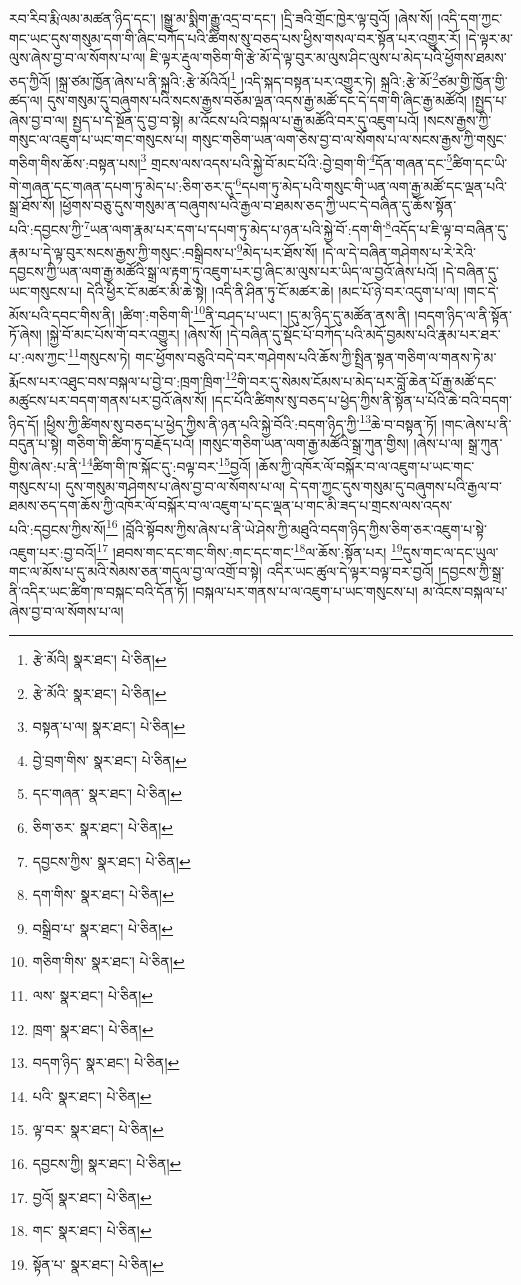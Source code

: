 རབ་རིབ་རྨི་ལམ་མཚན་ཉིད་དང་། །སྒྱུ་མ་སྨིག་རྒྱུ་འདྲ་བ་དང་། །དྲི་ཟའི་གྲོང་ཁྱེར་ལྟ་བུའོ། །ཞེས་སོ། །འདི་དག་ཀྱང་གང་ཡང་དུས་གསུམ་དག་གི་ཞིང་བཀོད་པའི་ཚིགས་སུ་བཅད་པས་ཕྱིས་གསལ་བར་སྟོན་པར་འགྱུར་རོ། །དེ་ལྟར་མ་ལུས་ཞེས་བྱ་བ་ལ་སོགས་པ་ལ། ཇི་ལྟར་རྡུལ་གཅིག་གི་རྩེ་མོ་དེ་ལྟ་བུར་མ་ལུས་ཤིང་ལུས་པ་མེད་པའི་ཕྱོགས་ཐམས་ཅད་ཀྱིའོ། །སྐྲ་ཙམ་ཁྱོན་ཞེས་པ་ནི་སྐྲའི་:རྩེ་མོའིའོ།\footnote{རྩེ་མོའི།  སྣར་ཐང་།  པེ་ཅིན། } །འདི་སྐད་བསྟན་པར་འགྱུར་ཏེ། སྐྲའི་:རྩེ་མོ་\footnote{རྩེ་མོའི་  སྣར་ཐང་།  པེ་ཅིན། }ཙམ་གྱི་ཁྱོན་གྱི་ཚད་ལ། དུས་གསུམ་དུ་བཞུགས་པའི་སངས་རྒྱས་བཅོམ་ལྡན་འདས་རྒྱ་མཚོ་དང་དེ་དག་གི་ཞིང་རྒྱ་མཚོའོ། །སྤྱད་པ་ཞེས་བྱ་བ་ལ། སྤྱད་པ་དེ་སྔོན་དུ་བྱ་བ་སྟེ། མ་འོངས་པའི་བསྐལ་པ་རྒྱ་མཚོའི་བར་དུ་འཇུག་པའོ། །སངས་རྒྱས་ཀྱི་གསུང་ལ་འཇུག་པ་ཡང་གང་གསུངས་པ། གསུང་གཅིག་ཡན་ལག་ཅེས་བྱ་བ་ལ་སོགས་པ་ལ་སངས་རྒྱས་ཀྱི་གསུང་གཅིག་གིས་ཆོས་:བསྟན་པས།\footnote{བསྟན་པ་ལ།  སྣར་ཐང་།  པེ་ཅིན། } གྲངས་ལས་འདས་པའི་སྐྱེ་བོ་མང་པོའི་:བྱེ་བྲག་གི་\footnote{བྱེ་བྲག་གིས་  སྣར་ཐང་།  པེ་ཅིན། }དོན་གཞན་དང་\footnote{དང་གཞན་  སྣར་ཐང་།  པེ་ཅིན། }ཚིག་དང་ཡི་གེ་གཞན་དང་གཞན་དཔག་ཏུ་མེད་པ་:ཅིག་ཅར་དུ་\footnote{ཅིག་ཅར་  སྣར་ཐང་།  པེ་ཅིན། }དཔག་ཏུ་མེད་པའི་གསུང་གི་ཡན་ལག་རྒྱ་མཚོ་དང་ལྡན་པའི་སྒྲ་ཐོས་སོ། །ཕྱོགས་བཅུ་དུས་གསུམ་ན་བཞུགས་པའི་རྒྱལ་བ་ཐམས་ཅད་ཀྱི་ཡང་དེ་བཞིན་དུ་ཆོས་སྟོན་པའི་:དབྱངས་ཀྱི་\footnote{དབྱངས་ཀྱིས་  སྣར་ཐང་།  པེ་ཅིན། }ཡན་ལག་རྣམ་པར་དག་པ་དཔག་ཏུ་མེད་པ་ཉན་པའི་སྐྱེ་བོ་:དག་གི་\footnote{དག་གིས་  སྣར་ཐང་།  པེ་ཅིན། }འདོད་པ་ཇི་ལྟ་བ་བཞིན་དུ་རྣམ་པ་དེ་ལྟ་བུར་སངས་རྒྱས་ཀྱི་གསུང་:བསྒྲིབས་པ་\footnote{བསྒྲིབ་པ་  སྣར་ཐང་།  པེ་ཅིན། }མེད་པར་ཐོས་སོ། །དེ་ལ་དེ་བཞིན་གཤེགས་པ་རེ་རེའི་དབྱངས་ཀྱི་ཡན་ལག་རྒྱ་མཚོའི་སྒྲ་ལ་རྟག་ཏུ་འཇུག་པར་བྱ་ཞིང་མ་ལུས་པར་ཡིད་ལ་བྱའོ་ཞེས་པའོ། །དེ་བཞིན་དུ་ཡང་གསུངས་པ། དེའི་ཕྱིར་ངོ་མཚར་མི་ཆེ་སྟེ། །འདི་ནི་ཤིན་ཏུ་ངོ་མཚར་ཆེ། །མང་པོ་ཉེ་བར་འདུག་པ་ལ། །གང་དེ་མོས་པའི་དབང་གིས་ནི། །ཚིག་:གཅིག་གི་\footnote{གཅིག་གིས་  སྣར་ཐང་།  པེ་ཅིན། }ནི་བཤད་པ་ཡང་། །དུ་མ་ཉིད་དུ་མཚོན་ནས་ནི། །བདག་ཉིད་ལ་ནི་སྟོན་ཏོ་ཞེས། །སྐྱེ་བོ་མང་པོས་གོ་བར་འགྱུར། །ཞེས་སོ། །དེ་བཞིན་དུ་སྡོང་པོ་བཀོད་པའི་མདོ་བྱམས་པའི་རྣམ་པར་ཐར་པ་:ལས་ཀྱང་\footnote{ལས་  སྣར་ཐང་།  པེ་ཅིན། }གསུངས་ཏེ། གང་ཕྱོགས་བཅུའི་བདེ་བར་གཤེགས་པའི་ཆོས་ཀྱི་སྤྲིན་སྟན་གཅིག་ལ་གནས་ཏེ་མ་རྨོངས་པར་འཐུང་བས་བསྐལ་པ་བྱེ་བ་:ཁྲག་ཁྲིག་\footnote{ཁྲག་  སྣར་ཐང་།  པེ་ཅིན། }གི་བར་དུ་སེམས་ངོམས་པ་མེད་པར་བློ་ཆེན་པོ་རྒྱ་མཚོ་དང་མཚུངས་པར་བདག་གནས་པར་བྱའོ་ཞེས་སོ། །དང་པོའི་ཚིགས་སུ་བཅད་པ་ཕྱེད་ཀྱིས་ནི་སྟོན་པ་པོའི་ཆེ་བའི་བདག་ཉིད་དོ། །ཕྱིས་ཀྱི་ཚིགས་སུ་བཅད་པ་ཕྱེད་ཀྱིས་ནི་ཉན་པའི་སྐྱེ་བོའི་:བདག་ཉིད་ཀྱི་\footnote{བདག་ཉིད་  སྣར་ཐང་།  པེ་ཅིན། }ཆེ་བ་བསྟན་ཏོ། །གང་ཞེས་པ་ནི་བདུན་པ་སྟེ། གཅིག་གི་ཚིག་ཏུ་བརྗོད་པའོ། །གསུང་གཅིག་ཡན་ལག་རྒྱ་མཚོའི་སྒྲ་ཀུན་གྱིས། །ཞེས་པ་ལ། སྒྲ་ཀུན་གྱིས་ཞེས་:པ་ནི་\footnote{པའི་  སྣར་ཐང་།  པེ་ཅིན། }ཚིག་གི་ཁ་སྐོང་དུ་:བལྟ་བར་\footnote{ལྟ་བར་  སྣར་ཐང་།  པེ་ཅིན། }བྱའོ། །ཆོས་ཀྱི་འཁོར་ལོ་བསྐོར་བ་ལ་འཇུག་པ་ཡང་གང་གསུངས་པ། དུས་གསུམ་གཤེགས་པ་ཞེས་བྱ་བ་ལ་སོགས་པ་ལ། དེ་དག་ཀྱང་དུས་གསུམ་དུ་བཞུགས་པའི་རྒྱལ་བ་ཐམས་ཅད་དག་ཆོས་ཀྱི་འཁོར་ལོ་བསྐོར་བ་ལ་འཇུག་པ་དང་ལྡན་པ་གང་མི་ཟད་པ་གྲངས་ལས་འདས་པའི་:དབྱངས་ཀྱིས་སོ།\footnote{དབྱངས་ཀྱི།  སྣར་ཐང་།  པེ་ཅིན། } །བློའི་སྟོབས་ཀྱིས་ཞེས་པ་ནི་ཡེ་ཤེས་ཀྱི་མཐུའི་བདག་ཉིད་ཀྱིས་ཅིག་ཅར་འཇུག་པ་སྟེ་འཇུག་པར་:བྱ་བའོ།\footnote{བྱའོ།  སྣར་ཐང་།  པེ་ཅིན། } །ཐབས་གང་དང་གང་གིས་:གང་དང་གང་\footnote{གང་  སྣར་ཐང་།  པེ་ཅིན། }ལ་ཆོས་:སྟོན་པར། \footnote{སྟོན་པ་  སྣར་ཐང་།  པེ་ཅིན། }དུས་གང་ལ་དང་ཡུལ་གང་ལ་མོས་པ་དུ་མའི་སེམས་ཅན་གདུལ་བྱ་ལ་འགྲོ་བ་སྟེ། འདིར་ཡང་ཚུལ་དེ་ལྟར་བལྟ་བར་བྱའོ། །དབྱངས་ཀྱི་སྒྲ་ནི་འདིར་ཡང་ཚིག་ཁ་བསྐང་བའི་དོན་ཏོ། །བསྐལ་པར་གནས་པ་ལ་འཇུག་པ་ཡང་གསུངས་པ། མ་འོངས་བསྐལ་པ་ཞེས་བྱ་བ་ལ་སོགས་པ་ལ། 